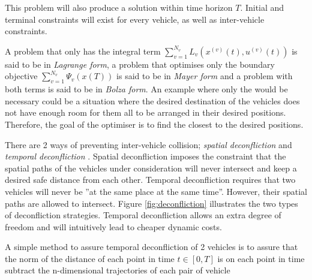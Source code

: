 \par This problem will also produce a solution within time horizon $T$. Initial and terminal constraints will exist for every vehicle, as well as inter-vehicle constraints.

\par A problem that only has the integral term $\sum_{v=1}^{N_v} L_v(x^{(v)}(t),u^{(v)}(t))$ is said to be in \textit{Lagrange form}, a problem that optimises only the boundary objective $\sum_{v=1}^{N_v} \Psi_v(x(T))$ is said to be in \textit{Mayer form} and a problem with both terms is said to be in \textit{Bolza form}. An example where only the  would be necessary could be a situation where the desired destination of the vehicles does not have enough room for them all to be arranged in their desired positions. Therefore, the goal of the optimiser is to find the closest to the desired positions.


\par There are 2 ways of preventing inter-vehicle collision; \textit{spatial deconfliction} and \textit{temporal deconfliction} \cite{hausler2015mission}.
Spatial deconfliction imposes the constraint that the spatial paths of the vehicles under consideration will never intersect and keep a desired safe distance from each other. Temporal deconfliction requires that two vehicles will never be ”at the same place at the same time”. However, their spatial paths are allowed to intersect. Figure \ref{fig:deconfliction} illustrates the two types of deconfliction strategies. Temporal deconfliction allows an extra degree of freedom and will intuitively lead to cheaper dynamic costs.

\par A simple method to assure temporal deconfliction of 2 vehicles is to assure that the norm of the distance of each point in time $t\in [0,T]$ is on each point in time subtract the n-dimensional trajectories of each pair of vehicle 

